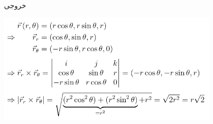 \begin{frame}{خروجی}
\begin{center}
\includegraphics[width=0.8\textwidth]{docs/images/math1}
\end{center}
\end{frame}
